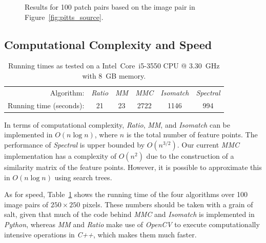 \begin{figure}[htb]
\begin{subfigure}[c]{.76\textwidth}
	\end{subfigure}%
	\caption{Results for 100 patch pairs based on the image pair in 
	Figure~\ref{fig:pitts_source}.}
	\label{fig:result_pitts}
\end{figure}
%
\subsection{Computational Complexity and Speed}
%
\begin{table}[htb]
\caption{Running times as tested on a Intel\textregistered\ Core\texttrademark\ i5-3550 CPU @ 
3.30~GHz with 8~GB memory.}
\label{table:running_times}
	\centering
\begin{tabular}{r*{5}{c}}
\hline
	Algorithm: & \emph{Ratio} & \emph{MM} & \emph{MMC} %
& \emph{Isomatch} & \emph{Spectral}	\\
	\noalign{\smallskip} 
	Running time (seconds): & 21 & 23 & 2722 & 1146 & 994\\
	\hline
\end{tabular}
\end{table}
In terms of computational complexity, \emph{Ratio}, \emph{MM}, and 
\emph{Isomatch} can be implemented in $O(n\log n)$, where $n$ is the 
total number of feature points. The performance of \emph{Spectral} is 
upper bounded by $O(n^{3/2})$. Our current \emph{MMC} implementation has 
a complexity of $O(n^2)$ due to the construction of a similarity matrix 
of the feature points.  However, it is possible to approximate this in 
$O(n\log n)$ using search trees.  

As for speed, Table~\ref{table:running_times} shows the running time of 
the four algorithms over 100 image pairs of $250\!\times\!250$ pixels.  
These numbers should be taken with a grain of salt, given that much of 
the code behind \emph{MMC} and \emph{Isomatch} is implemented in 
\emph{Python}, whereas \emph{MM} and \emph{Ratio} make use of 
\emph{OpenCV} to execute computationally intensive operations in 
\emph{C++}, which makes them much faster. 

